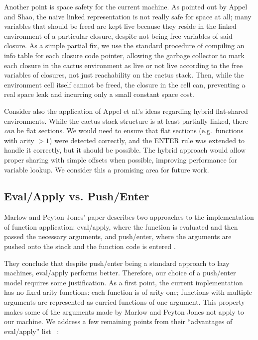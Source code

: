 Another point is space safety for the current machine. As pointed out by Appel
and Shao, the naive linked representation is not really safe for space at all;
many variables that should be freed are kept live because they reside in the linked
environment of a particular closure, despite not being free variables of said
closure. As a simple partial fix, we use the standard procedure of compiling an
info table for each closure code pointer, allowing the garbage collector to mark
each closure in the cactus environment as live or not live according to the free
variables of closures, not just reachability on the cactus stack. Then, while
the environment cell itself cannot be freed, the closure in the cell can,
preventing a real space leak and incurring only a small constant space cost.

Consider also the application of Appel et al.'s ideas regarding hybrid
flat-shared environments. While the cactus stack structure is at least partially
linked, there \emph{can} be flat sections. We would need to ensure that flat
sections (e.g.\ functions with arity $> 1$) were detected correctly, and the
ENTER rule was extended to handle it correctly, but it should be possible. The
hybrid approach would allow proper sharing with simple offsets when possible,
improving performance for variable lookup. We consider this a promising area for
future work.

\subsection{Eval/Apply vs. Push/Enter}

Marlow and Peyton Jones' paper describes two approaches to the implementation of
function application: eval/apply, where the function is evaluated and then
passed the necessary arguments, and push/enter, where the arguments are pushed
onto the stack and the function code is entered \cite{marlow2004making}.

They conclude that despite push/enter being a standard approach to lazy
machines, eval/apply performs better. Therefore, our choice of a push/enter
model requires some justification.  As a first point, the current implementation
has no fixed arity functions: each function is of arity one; functions with
multiple arguments are represented as curried functions of one argument.  This
property makes some of the arguments made by Marlow and Peyton Jones not apply
to our machine. We address a few remaining points from their ``advantages of
eval/apply'' list ~\cite{marlow2004making}:

